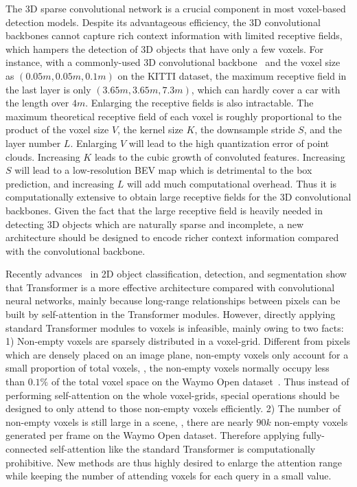 \documentclass[10pt,twocolumn,letterpaper]{article}
\begin{document}
The 3D sparse convolutional network is a crucial component in most voxel-based detection models. Despite its advantageous efficiency, the 3D convolutional backbones cannot capture rich context information with limited receptive fields, which hampers the detection of 3D objects that have only a few voxels. For instance, with a commonly-used 3D convolutional backbone~\cite{yan2018second} and the voxel size as $(0.05m, 0.05m, 0.1m)$ on the KITTI dataset, the maximum receptive field in the last layer is only $(3.65m, 3.65m, 7.3m)$, which can hardly cover a car with the length over $4m$. Enlarging the receptive fields is also intractable. The maximum theoretical receptive field of each voxel is roughly proportional to the product of the voxel size $V$, the kernel size $K$, the downsample stride $S$, and the layer number $L$. Enlarging $V$ will lead to the high quantization error of point clouds. Increasing $K$ leads to the cubic growth of convoluted features. Increasing $S$ will lead to a low-resolution BEV map which is detrimental to the box prediction, and increasing $L$ will add much computational overhead. Thus it is computationally extensive to obtain large receptive fields for the 3D convolutional backbones. Given the fact that the large receptive field is heavily needed in detecting 3D objects which are naturally sparse and incomplete, a new architecture should be designed to encode richer context information compared with the convolutional backbone.   

Recently advances~\cite{dosovitskiy2020image, carion2020end, zheng2020rethinking} in 2D object classification, detection, and segmentation show that Transformer is a more effective architecture compared with convolutional neural networks, mainly because long-range relationships between pixels can be built by self-attention in the Transformer modules. However, directly applying standard Transformer modules to voxels is infeasible, mainly owing to two facts: 1) Non-empty voxels are sparsely distributed in a voxel-grid. Different from pixels which are densely placed on an image plane, non-empty voxels only account for a small proportion of total voxels, \eg, the non-empty voxels normally occupy less than $0.1\%$ of the total voxel space on the Waymo Open dataset~\cite{sun2020scalability}. Thus instead of performing self-attention on the whole voxel-grids, special operations should be designed to only attend to those non-empty voxels efficiently. 2) The number of non-empty voxels is still large in a scene, \eg, there are nearly $90k$ non-empty voxels generated per frame on the Waymo Open dataset. Therefore applying fully-connected self-attention like the standard Transformer is computationally prohibitive. New methods are thus highly desired to enlarge the attention range while keeping the number of attending voxels for each query in a small value.   
\end{document}

